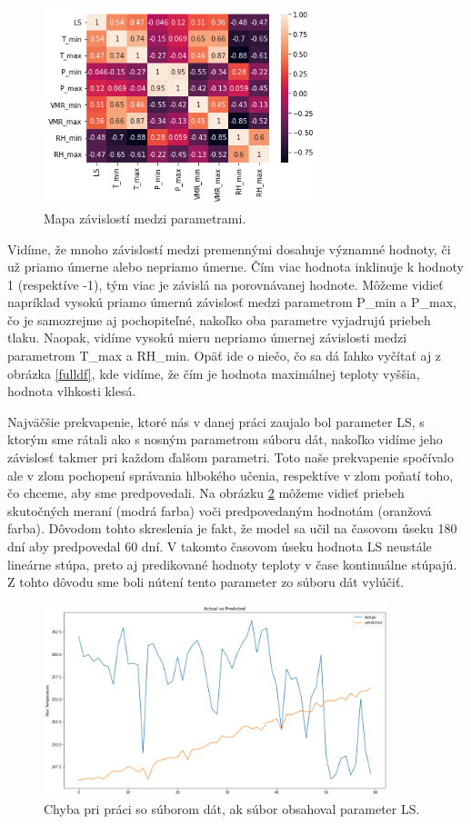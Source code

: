 \begin{figure}[!htbp]
  \centering
  \includegraphics[width=8cm]{img/heatmap.png}
  \caption{Mapa závislostí medzi parametrami.}
  \label{heatmap}
\end{figure}

Vidíme, že mnoho závislostí medzi premennými dosahuje významné hodnoty, či už priamo úmerne alebo nepriamo úmerne. Čím viac hodnota inklinuje k hodnoty 1 (respektíve -1), tým viac je závislá na porovnávanej hodnote. Môžeme vidieť napríklad vysokú priamo úmernú závislosť medzi parametrom P\_min a P\_max, čo je samozrejme aj pochopiteľné, nakoľko oba parametre vyjadrujú priebeh tlaku. Naopak, vidíme vysokú mieru nepriamo úmernej závislosti medzi parametrom T\_max a RH\_min. Opäť ide o niečo, čo sa dá ľahko vyčítať aj z obrázka \ref{fulldf}, kde vidíme, že čím je hodnota maximálnej teploty vyššia, hodnota vlhkosti klesá.

Najväčšie prekvapenie, ktoré nás v danej práci zaujalo bol parameter LS, s ktorým sme rátali ako s nosným parametrom súboru dát, nakoľko vidíme jeho závislosť takmer pri každom ďalšom parametri. Toto naše prekvapenie spočívalo ale v zlom pochopení správania hlbokého učenia, respektíve v zlom poňatí toho, čo chceme, aby sme predpovedali. Na obrázku \ref{ls_error} môžeme vidieť priebeh skutočných meraní (modrá farba) voči predpovedaným hodnotám (oranžová farba). Dôvodom tohto skreslenia je fakt, že model sa učil na časovom úseku 180 dní aby predpovedal 60 dní. V takomto časovom úseku hodnota LS neustále lineárne stúpa, preto aj predikované hodnoty teploty v čase kontinuálne stúpajú. Z tohto dôvodu sme boli nútení tento parameter zo súboru dát vylúčiť.

\begin{figure}[!htbp]
  \centering
  \includegraphics[width=10cm]{img/ls_error.png}
  \caption{Chyba pri práci so súborom dát, ak súbor obsahoval parameter LS.}
  \label{ls_error}
\end{figure}

